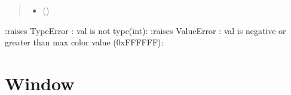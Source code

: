 \documentclass[letterpaper,10pt,english]{sphinxmanual}
\begin{document}
\begin{fulllineitems}
\begin{fulllineitems}
\begin{quote}
\begin{description}
\begin{itemize}
\item {} 
\sphinxAtStartPar
{} () \textendash{} 

\end{itemize}

\end{description}\end{quote}

\sphinxAtStartPar
:raises TypeError : val is not type(int):
:raises ValueError : val is negative or greater than max color value (0xFFFFFF):

\end{fulllineitems}


\end{fulllineitems}


\sphinxstepscope


\section{Window}
\label{\detokenize{window:module-window}}\label{\detokenize{window:window}}\label{\detokenize{window::doc}}
\end{document}
